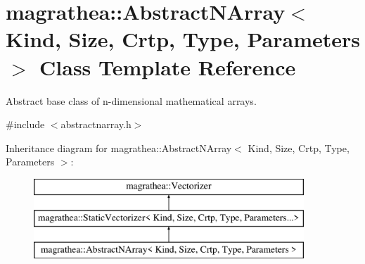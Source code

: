 \hypertarget{classmagrathea_1_1AbstractNArray}{\section{magrathea\-:\-:Abstract\-N\-Array$<$ Kind, Size, Crtp, Type, Parameters $>$ Class Template Reference}
\label{classmagrathea_1_1AbstractNArray}
}


Abstract base class of n-\/dimensional mathematical arrays.  




{\ttfamily \#include $<$abstractnarray.\-h$>$}

Inheritance diagram for magrathea\-:\-:Abstract\-N\-Array$<$ Kind, Size, Crtp, Type, Parameters $>$\-:\begin{figure}[H]
\begin{center}
\leavevmode
\includegraphics[height=3.000000cm]{classmagrathea_1_1AbstractNArray}
\end{center}
\end{figure}
